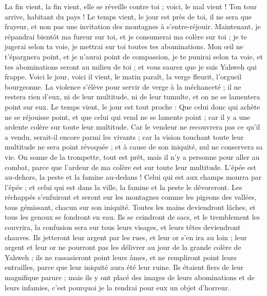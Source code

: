 \begin{multicols}{2}
La fin vient, la fin vient, elle se réveille contre toi ; voici, le mal vient !
Ton tour arrive, habitant du pays ! Le temps vient, le jour est près de toi, il ne sera que frayeur, et non pas une invitation des montagnes  à s’entre-réjouir.
Maintenant, je répandrai bientôt ma fureur sur toi, et je consumerai ma colère sur toi ; je te jugerai selon ta voie, je mettrai sur toi toutes tes abominations.
Mon œil ne t'épargnera point, et je n'aurai point de compassion, je te punirai selon ta voie, et tes abominations seront au milieu de toi ; et vous saurez que je suis Yahweh qui frappe.
Voici le jour, voici il vient, le matin paraît, la verge fleurit, l’orgueil bourgeonne.
La violence s’élève pour servir de verge à la méchanceté ; il ne restera rien d'eux, ni de leur multitude, ni de leur tumulte, et on ne se lamentera point sur eux.
Le temps vient, le jour est tout proche : Que celui donc qui achète ne se réjouisse point, et que celui qui vend ne se lamente point ; car il y a une ardente colère sur toute leur multitude.
Car le vendeur ne recouvrera pas ce qu’il a vendu, serait-il encore parmi les vivants ; car la vision touchant toute leur multitude ne sera point révoquée ; et à cause de son iniquité, nul ne conservera sa vie.
On sonne de la trompette, tout est prêt, mais il n'y a personne pour aller au combat, parce que l'ardeur de ma colère est sur toute leur multitude.
L'épée est au-dehors, la peste et la famine au-dedans ! Celui qui est aux champs mourra par l'épée ; et celui qui est dans la ville, la famine et la peste le dévoreront.
Les réchappés s'enfuiront et seront sur les montagnes comme les pigeons des vallées, tous gémissant, chacun sur son iniquité.
Toutes les mains deviendront lâches, et tous les genoux se fondront en eau.
Ils se ceindront de sacs, et le tremblement les couvrira, la confusion sera sur tous leurs visages, et leurs têtes deviendront chauves.
Ils jetteront leur argent par les rues, et leur or s'en ira au loin ; leur argent et leur or ne pourront pas les délivrer au jour de la grande colère de Yahweh ; ils ne rassasieront point leurs âmes, et ne rempliront point leurs entrailles, parce que leur iniquité aura été leur ruine.
Ils étaient fiers de leur magnifique parure ; mais ils y ont placé des images de leurs abominations et de leurs infamies, c'est pourquoi je la rendrai pour eux un objet d’horreur.

\end{multicols}
